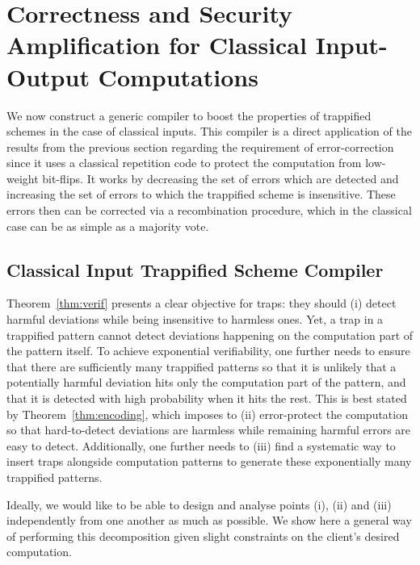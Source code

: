 \documentclass[12pt]{iopart}
\renewcommand{\1}{\mathds{1}}
\begin{document}
\section{Correctness and Security Amplification for Classical Input-Output Computations}
\label{sec:rvbqc}
We now construct a generic compiler to boost the properties of trappified schemes in the case of classical inputs. This compiler is a direct application of the results from the previous section regarding the requirement of error-correction since it uses a classical repetition code to protect the computation from low-weight bit-flips. It works by decreasing the set of errors which are detected and increasing the set of errors to which the trappified scheme is insensitive. These errors then can be corrected via a recombination procedure, which in the classical case can be as simple as a majority vote.

\subsection{Classical Input Trappified Scheme Compiler}
Theorem~\ref{thm:verif} presents a clear objective for traps: they should (i) detect harmful deviations while being insensitive to harmless ones.
Yet, a trap in a trappified pattern cannot detect deviations happening on the computation part of the pattern itself.
To achieve exponential verifiability, one further needs to ensure that there are sufficiently many trappified patterns so that it is unlikely that a potentially harmful deviation hits only the computation part of the pattern, and that it is detected with high probability when it hits the rest.
This is best stated by Theorem~\ref{thm:encoding}, which imposes to (ii) error-protect the computation so that hard-to-detect deviations are harmless while remaining harmful errors are easy to detect.
Additionally, one further needs to (iii) find a systematic way to insert traps alongside computation patterns to generate these exponentially many trappified patterns.

Ideally, we would like to be able to design and analyse points (i), (ii) and (iii) independently from one another as much as possible. We show here a general way of performing this decomposition given slight constraints on the client's desired computation.
\end{document}
